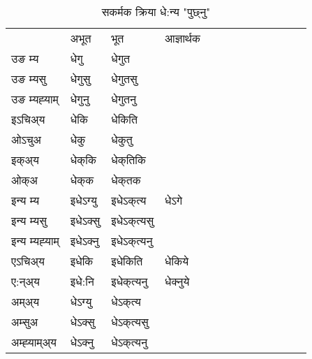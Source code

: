 \begin{table}[H]
\label{ek.vt} \centering
\caption{सकर्मक क्रिया  धे:न्य  "पुछ्नु"  }
\begin{tabular}{l|l|l|l|l|l|l|l|l|l|l|l|l}  \toprule
&अभूत & भूत & आज्ञार्थक \\ 
उङ म्य &धेगु &धेगुत \\ 
उङ म्यसु &धेगुसु &धेगुतसु \\ 
उङ म्यह्‍याम् &धेगुनु &धेगुतनु \\ 
इऽचिअ्य  &धेकि &धेकिति   \\ 
ओऽचुअ &धेकु &धेकुतु   \\ 
इक्अ्य &धेक्‌कि &धेक्‌तिकि   \\ 
ओक्अ &धेक्‌क &धेक्‌तक   \\ 
इन्य म्य& इधेऽग्यु  & इधेऽक्‌त्य &धेऽगे  \\ 
इन्य म्यसु & इधेऽक्सु  & इधेऽक्‌त्यसु   \\ 
इन्य म्यह्‍याम् & इधेऽक्‍नु  & इधेऽक्‌त्यनु   \\ 
एऽचिअ्य & इधेकि & इधेकिति &धेकिये    \\ 
ए:न्अ्य & इधे:नि  & इधेक्‌त्यनु &धेक्‍नुये  \\ 
अम्अ्य & धेऽग्यु  & धेऽक्‌त्य  \\ 
अम्सुअ & धेऽक्सु & धेऽक्‌त्यसु  \\ 
अम्ह्‍याम्अ्य & धेऽक्‍नु  & धेऽक्‌त्यनु \\ 
\bottomrule
\end{tabular}
\end{table}


